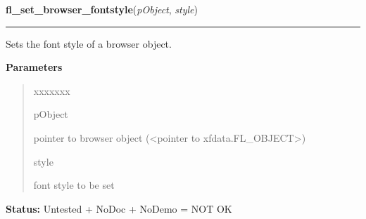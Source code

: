 \hspace{.8\funcindent}\begin{boxedminipage}{\funcwidth}

    \raggedright \textbf{fl\_set\_browser\_fontstyle}(\textit{pObject}, \textit{style})

    \vspace{-1.5ex}

    \rule{\textwidth}{0.5\fboxrule}
\setlength{\parskip}{2ex}
    Sets the font style of a browser object.

\setlength{\parskip}{1ex}
      \textbf{Parameters}
      \vspace{-1ex}

      \begin{quote}
        \begin{Ventry}{xxxxxxx}

          \item[pObject]

          pointer to browser object ({\textless}pointer to 
          xfdata.FL\_OBJECT{\textgreater})

          \item[style]

          font style to be set

        \end{Ventry}

      \end{quote}

\textbf{Status:} Untested + NoDoc + NoDemo = NOT OK



    \end{boxedminipage}

    \label{xformslib:library:fl_set_browser_specialkey}

    \vspace{0.5ex}

